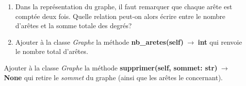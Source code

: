 \documentclass[a4paper,11pt]{article}
\begin{document}
\begin{Form}
\begin{exo}
\end{exo}
\begin{exo}
\begin{enumerate}
\item Dans la représentation du graphe, il faut remarquer que chaque arête est comptée deux fois. Quelle relation peut-on alors écrire entre le nombre d'arêtes et la somme totale des degrés?
\item Ajouter à la classe \emph{Graphe} la méthode \textbf{nb\_aretes(self)$\;\rightarrow\;$int} qui renvoie le nombre total d'arêtes.
\end{enumerate}
\end{exo}
\begin{exo}
Ajouter à la classe \emph{Graphe} la méthode \textbf{supprimer(self, sommet: str)$\;\rightarrow\;$None} qui retire le \emph{sommet} du graphe (ainsi que les arêtes le concernant).
\end{exo}
\end{Form}
\end{document}
